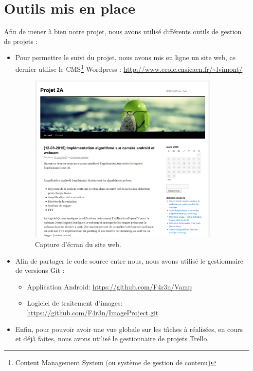 \section{Outils mis en place}

Afin de mener à bien notre projet, nous avons utilisé différents outils de gestion de projets :

\begin{itemize}
	\item Pour permettre le suivi du projet, nous avons mis en ligne un site web, ce dernier utilise le CMS\footnote{Content Management System (ou système de gestion de contenu)} Wordpress : \url{http://www.ecole.ensicaen.fr/~lvimont/}

		\begin{figure}[h!]
			\centering
			\includegraphics[width=0.9\textwidth]{data/website.png}
			\caption{Capture d'écran du site web.}
		\end{figure}

	\item Afin de partager le code source entre nous, nous avons utilisé le gestionnaire de versions Git :
		\begin{itemize}[label=\textbullet]
			\item Application Android: \url{https://github.com/F4r3n/Vamp}
			\item Logiciel de traitement d'images: \url{https://github.com/F4r3n/ImageProject.git}
		\end{itemize}
	\item Enfin, pour pouvoir avoir une vue globale sur les tâches à réalisées, en cours et déjà faites, nous avons utilisé le gestionnaire de projets Trello.
\end{itemize}

